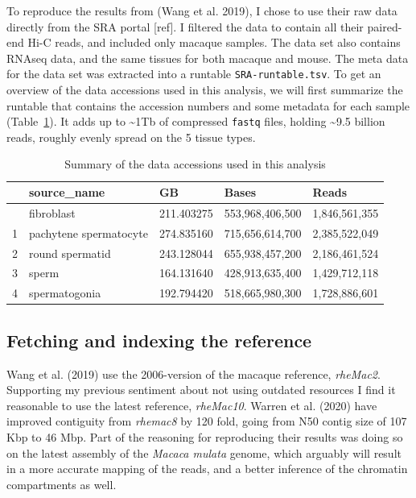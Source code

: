 \documentclass[
  11pt,
  a4paper,
]{scrbook}
\let\oldemph\emph
\renewcommand\emph[1]{\oldemph{\color{gray}#1}}
\begin{document}
To reproduce the results from (Wang et al. 2019), I chose to use their
raw data directly from the SRA portal {[}ref{]}. I filtered the data to
contain all their paired-end Hi-C reads, and included only macaque
samples. The data set also contains RNAseq data, and the same tissues
for both macaque and mouse. The meta data for the data set was extracted
into a runtable \texttt{SRA-runtable.tsv}. To get an overview of the
data accessions used in this analysis, we will first summarize the
runtable that contains the accession numbers and some metadata for each
sample (Table~\ref{tbl-runtable-summary}). It adds up to
\textasciitilde1Tb of compressed \texttt{fastq} files, holding
\textasciitilde9.5 billion reads, roughly evenly spread on the 5 tissue
types.

\small

\begin{longtable}[]{@{}lllll@{}}

\caption{\label{tbl-runtable-summary}Summary of the data accessions used
in this analysis}

\tabularnewline

\toprule\noalign{}
& source\_name & GB & Bases & Reads \\
\midrule\noalign{}
\endhead
\bottomrule\noalign{}
\endlastfoot
0 & fibroblast & 211.403275 & 553,968,406,500 & 1,846,561,355 \\
1 & pachytene spermatocyte & 274.835160 & 715,656,614,700 &
2,385,522,049 \\
2 & round spermatid & 243.128044 & 655,938,457,200 & 2,186,461,524 \\
3 & sperm & 164.131640 & 428,913,635,400 & 1,429,712,118 \\
4 & spermatogonia & 192.794420 & 518,665,980,300 & 1,728,886,601 \\

\end{longtable}

\normalsize

\subsection{Fetching and indexing the
reference}\label{fetching-and-indexing-the-reference}

Wang et al. (2019) use the 2006-version of the macaque reference,
\emph{rheMac2}. Supporting my previous sentiment about not using
outdated resources I find it reasonable to use the latest reference,
\emph{rheMac10}. Warren et al. (2020) have improved contiguity from
\emph{rhemac8} by 120 fold, going from N50 contig size of 107 Kbp to 46
Mbp. Part of the reasoning for reproducing their results was doing so on
the latest assembly of the \emph{Macaca mulata} genome, which arguably
will result in a more accurate mapping of the reads, and a better
inference of the chromatin compartments as well.
\end{document}
